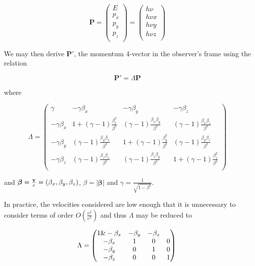 \documentclass[useAMS,usenatbib,usegraphicx]{mnras}
\begin{document}
\begin{equation}
\mathbf{P}=
\begin{pmatrix}
	E \\
	p_x \\
	p_y \\
	p_z \\
	\end{pmatrix} =
	\begin{pmatrix}
	h \nu \\
	h \nu x \\
	h \nu y \\
	h \nu z \\
	\end{pmatrix}
\end{equation}


\noindent We may then derive $\mathbf{P'}$, the momentum 4-vector in the 
observer's frame using the relation

\begin{equation}
	\mathbf{P'}=\Lambda \mathbf{P}	
\end{equation}

\noindent where 

\[
	{\Lambda}=
	 \begin{pmatrix} 
	  \gamma & -\gamma \beta_x & -\gamma \beta_y & -\gamma \beta_z \\
	 -\gamma \beta_x & 1+(\gamma-1)\frac{\beta_x^2}{\beta^2} & (\gamma-1)\frac{\beta_x \beta_y}{\beta^2} & (\gamma-1)\frac{\beta_x \beta_z}{\beta^2} \\
	 -\gamma \beta_y  & (\gamma-1)\frac{\beta_y \beta_x}{\beta^2} & 1+(\gamma-1)\frac{\beta_y^2}{\beta^2} & (\gamma-1)\frac{\beta_y \beta_z}{\beta^2} \\
	 -\gamma \beta_z & (\gamma-1)\frac{\beta_z \beta_x}{\beta^2} & (\gamma-1)\frac{\beta_z \beta_y}{\beta^2} & 1+(\gamma-1)\frac{\beta_z^2}{\beta^2} \\
	 \end{pmatrix}
\]

 \noindent and $\boldsymbol{\beta}=\frac{{\bf{v}}}{c}=(\beta_x,\beta_y,\beta_z)$,   $\beta=\lvert \boldsymbol{\beta} \rvert$ and $\gamma = \frac{1}{\sqrt{1-\beta^2}}$.


In practice, the velocities considered are low enough that it is 
unnecessary to consider terms of order $O(\frac{v^2}{c^2})$ and thus 
${\Lambda}$ may be reduced to

\begin{equation}
	{\Lambda}=
	 \begin{pmatrix} 
	 1 \& - \beta_x & - \beta_y & - \beta_z \\
	- \beta_x & 1 & 0 & 0 \\
	- \beta_y  & 0 & 1 & 0\\
	- \beta_z & 0 & 0 & 1 \\
	 \end{pmatrix}
	 \\
\end{equation}
\end{document}
